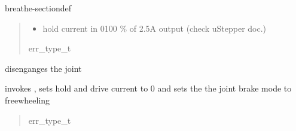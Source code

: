 \documentclass[letterpaper,10pt,english]{sphinxmanual}
\begin{document}
\begin{fulllineitems}
\begin{sphinxuseclass}{breathe-sectiondef}
\begin{fulllineitems}
\begin{quote}
\begin{description}
\begin{itemize}
\item {} 
\sphinxAtStartPar
{} \textendash{} hold current in 0\sphinxhyphen{}100 \% of 2.5A output (check uStepper doc.) 

\end{itemize}

\sphinxAtStartPar
err\_type\_t 

\end{description}\end{quote}

\end{fulllineitems}


\begin{fulllineitems}
\label{\detokenize{code/bioscara_hardware_drivers/index:_CPPv4N25bioscara_hardware_drivers25bioscara_hardware_drivers9BaseJoint7disableEv}}\label{\detokenize{code/bioscara_hardware_drivers/index:_CPPv3N25bioscara_hardware_drivers25bioscara_hardware_drivers9BaseJoint7disableEv}}\label{\detokenize{code/bioscara_hardware_drivers/index:_CPPv2N25bioscara_hardware_drivers25bioscara_hardware_drivers9BaseJoint7disableEv}}\label{\detokenize{code/bioscara_hardware_drivers/index:bioscara_hardware_drivers::bioscara_hardware_drivers::BaseJoint::disable__void}}
\pysigstartsignatures
\pysigstartmultiline
\pysiglinewithargsret
{\label{\detokenize{code/bioscara_hardware_drivers/index:classbioscara__hardware__drivers_1_1BaseJoint_1ab6d12171276b56bae07d1b194a90844e}}}
{}
{}
\pysigstopmultiline
\pysigstopsignatures
\sphinxAtStartPar
disenganges the joint 

\sphinxAtStartPar
invokes {\hyperref[\detokenize{code/bioscara_hardware_drivers/index:classbioscara__hardware__drivers_1_1BaseJoint_1aa604fcfc2283f48f0851aaf1439f7809}]{}}, sets hold and drive current to 0 and sets the the joint brake mode to freewheeling 
\begin{quote}\begin{description}
\sphinxAtStartPar
err\_type\_t 


\end{description}
\end{quote}
\end{fulllineitems}
\end{sphinxuseclass}
\end{fulllineitems}
\end{document}
